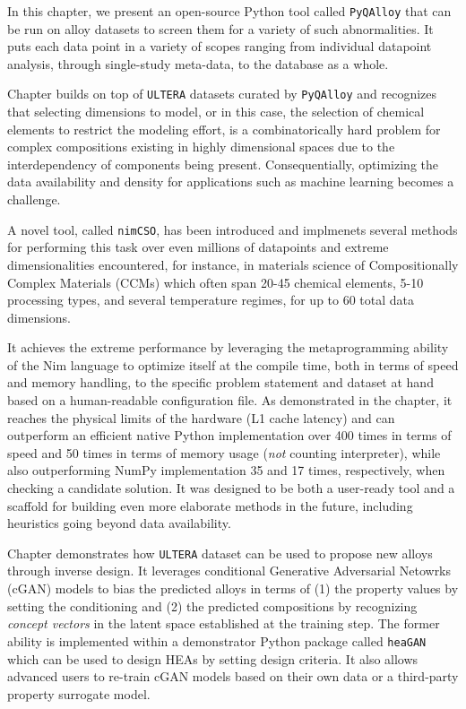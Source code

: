 In this chapter, we present an open-source Python tool called \texttt{PyQAlloy} that can be run on alloy datasets to screen them for a variety of such abnormalities. It puts each data point in a variety of scopes ranging from individual datapoint analysis, through single-study meta-data, to the database as a whole.


Chapter  builds on top of \texttt{ULTERA} datasets curated by \texttt{PyQAlloy} and recognizes that selecting dimensions to model, or in this case, the selection of chemical elements to restrict the modeling effort, is a combinatorically hard problem for complex compositions existing in highly dimensional spaces due to the interdependency of components being present. Consequentially, optimizing the data availability and density for applications such as machine learning becomes a challenge.

A novel tool, called \texttt{nimCSO}, has been introduced and implmenets several methods for performing this task over even millions of datapoints and extreme dimensionalities encountered, for instance, in materials science of Compositionally Complex Materials (CCMs) which often span 20-45 chemical elements, 5-10 processing types, and several temperature regimes, for up to 60 total data dimensions.

It achieves the extreme performance by leveraging the metaprogramming ability of the Nim language to optimize itself at the compile time, both in terms of speed and memory handling, to the specific problem statement and dataset at hand based on a human-readable configuration file. As demonstrated in the chapter, it reaches the physical limits of the hardware (L1 cache latency) and can outperform an efficient native Python implementation over 400 times in terms of speed and 50 times in terms of memory usage (\emph{not} counting interpreter), while also outperforming NumPy implementation 35 and 17 times, respectively, when checking a candidate solution. It was designed to be both a user-ready tool and a scaffold for building even more elaborate methods in the future, including heuristics going beyond data availability. 


Chapter  demonstrates how \texttt{ULTERA} dataset can be used to propose new alloys through inverse design. It leverages conditional Generative Adversarial Netowrks (cGAN) models to bias the predicted alloys in terms of (1) the property values by setting the conditioning and (2) the predicted compositions by recognizing \emph{concept vectors} in the latent space established at the training step. The former ability is implemented within a demonstrator Python package called \texttt{heaGAN} which can be used to design HEAs by setting design criteria. It also allows advanced users to re-train cGAN models based on their own data or a third-party property surrogate model.

